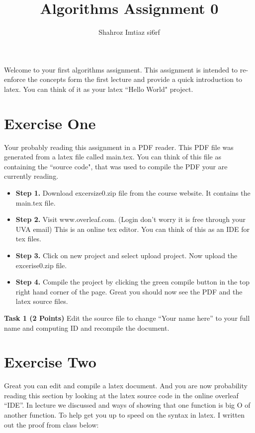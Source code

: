\documentclass[12pt]{extarticle}
\title{Algorithms Assignment 0}
\author{Shahroz Imtiaz si6rf}
\date{}
\begin{document}
\maketitle

Welcome to your first algorithms assignment. This assignment is intended to re-enforce the concepts form the first lecture and provide a quick introduction to latex. You can think of it as your latex ``Hello World" project. 


\section{Exercise One}
Your probably reading this assignment in a PDF reader. This PDF file was generated from a latex file called main.tex. You can think of this file as containing the ``source code", that was used to compile the PDF your are currently reading.

\begin{itemize}
    \item {\bf Step 1.} Download excersize0.zip file from the course website. It contains the main.tex file. 
    
    \item {\bf Step 2.} Visit www.overleaf.com. (Login don't worry it is free through your UVA email)  This is an online tex editor. You can think of this as an IDE for tex files. 

    \item {\bf Step 3. } Click on new project and select upload project. Now upload the excerise0.zip file. 
    
    \item {\bf Step 4. } Compile the project by clicking the green compile button in the top right hand corner of the page. Great you should now see the PDF and the latex source files. 

\end{itemize}
    
{\bf Task 1 (2 Points) } Edit the source file to change ``Your name here'' to your full name and computing ID and recompile the document. 


\section{Exercise Two}
Great you can edit and compile a latex document. And you are now probability reading this section by looking at the latex source code in the online overleaf ``IDE''. In lecture we discussed and ways of showing that one function is big O of another function. To help get you up to speed on the syntax in latex. I written out the proof from class below: 
\end{document}
